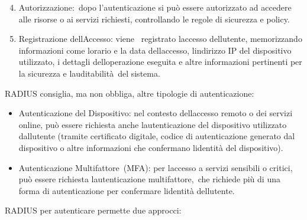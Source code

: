 \documentclass[
]{article}
\providecommand{\tightlist}{%
  \setlength{\itemsep}{0pt}\setlength{\parskip}{0pt}}
\begin{document}
{}

\begin{enumerate}
\setcounter{enumi}{3}
\tightlist
\item
  {Autorizzazione:}{~dopo l'autenticazione si può essere autorizzato ad
  accedere alle risorse o ai servizi richiesti, controllando le regole
  di sicurezza e policy.}
\end{enumerate}

{}

\begin{enumerate}
\setcounter{enumi}{4}
\tightlist
\item
  {Registrazione dell\textquotesingle Accesso}{: viene ~registrato
  l\textquotesingle accesso dell\textquotesingle utente, memorizzando
  informazioni come l\textquotesingle orario e la data
  dell\textquotesingle accesso, l\textquotesingle indirizzo IP del
  dispositivo utilizzato, i dettagli dell\textquotesingle operazione
  eseguita e altre informazioni pertinenti per la sicurezza e
  }{l\textquotesingle auditabilità}{~del sistema.}
\end{enumerate}

{}

{RADIUS consiglia, ma non obbliga, altre tipologie di autenticazione:}

\begin{itemize}
\tightlist
\item
  {Autenticazione del Dispositivo}{: nel contesto
  dell\textquotesingle accesso remoto o dei servizi online, può essere
  richiesta anche l\textquotesingle autenticazione del dispositivo
  utilizzato dall\textquotesingle utente (tramite certificato digitale,
  codice di autenticazione generato dal dispositivo o altre informazioni
  che confermano l\textquotesingle identità del dispositivo).}
\end{itemize}

{}

\begin{itemize}
\tightlist
\item
  {Autenticazione }{Multifattore}{~(MFA)}{: per
  l\textquotesingle accesso a servizi sensibili o critici, può essere
  richiesta l\textquotesingle autenticazione }{multifattore,}{~che
  richiede più di una forma di autenticazione per confermare
  l\textquotesingle identità dell\textquotesingle utente.}
\end{itemize}

{}

{RADIUS per autenticare permette due approcci:}
\end{document}
